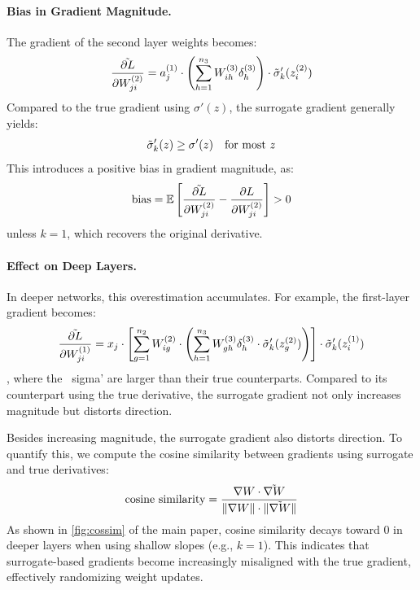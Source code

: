 \paragraph{Bias in Gradient Magnitude.}
The gradient of the second layer weights becomes:
\[
\Tilde{\frac{\partial L}{\partial W^{(2)}_{ji}}} = a_j^{(1)} \cdot \left( \sum_{h=1}^{n_3} W_{ih}^{(3)} \delta_h^{(3)} \right) \cdot \Tilde{\sigma}'_k(z^{(2)}_i)
\]
Compared to the true gradient using \( \sigma'(z) \), the surrogate gradient generally yields:
\[
\Tilde{\sigma}'_k(z) \geq \sigma'(z) \quad \text{for most } z
\]
This introduces a positive bias in gradient magnitude, as:
\[
\text{bias} = \mathbb{E}\left[ \Tilde{\frac{\partial L}{\partial W^{(2)}_{ji}}} - \frac{\partial L}{\partial W^{(2)}_{ji}} \right] > 0
\]
unless \( k = 1 \), which recovers the original derivative.

\paragraph{Effect on Deep Layers.}
In deeper networks, this overestimation accumulates. For example, the first-layer gradient becomes:
\[
\Tilde{\frac{\partial L}{\partial W^{(1)}_{ji}}} = x_j \cdot \left[
\sum_{g=1}^{n_2} W^{(2)}_{ig} \cdot \left( \sum_{h=1}^{n_3} W^{(3)}_{gh} \delta^{(3)}_h \cdot \Tilde{\sigma}'_k(z^{(2)}_g) \right)
\right] \cdot \Tilde{\sigma}'_k(z^{(1)}_i)
\], where the ~sigma' are larger than their true counterparts. 
Compared to its counterpart using the true derivative, the surrogate gradient not only increases magnitude but distorts direction.

Besides increasing magnitude, the surrogate gradient also distorts direction. To quantify this, we compute the cosine similarity between gradients using surrogate and true derivatives:
\[
\text{cosine similarity} = \frac{\nabla W \cdot \Tilde{\nabla W}}{\|\nabla W\| \cdot \|\Tilde{\nabla W}\|}
\]
As shown in \autoref{fig:cossim} of the main paper, cosine similarity decays toward 0 in deeper layers when using shallow slopes (e.g., \( k=1 \)). This indicates that surrogate-based gradients become increasingly misaligned with the true gradient, effectively randomizing weight updates.


